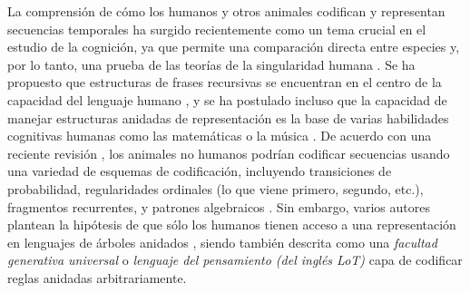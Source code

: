 
La comprensión de cómo los humanos y otros animales codifican y representan secuencias temporales ha surgido recientemente como un tema crucial en el estudio de la cognición, ya que permite una comparación directa entre especies y, por lo tanto, una prueba de las teorías de la singularidad humana \cite{f4,f5}. Se ha propuesto que estructuras de frases recursivas se encuentran en el centro de la capacidad del lenguaje humano \cite{f6}, y se ha postulado incluso que la capacidad de manejar estructuras anidadas de representación es la base de varias habilidades cognitivas humanas como las matemáticas o la música \cite{f4,f7,f8,f9}. De acuerdo con una reciente revisión \cite{f4}, los animales no humanos podrían codificar secuencias usando una variedad de esquemas de codificación, incluyendo transiciones de probabilidad, regularidades ordinales (lo que viene primero, segundo, etc.), fragmentos recurrentes, y patrones algebraicos \cite{f10,f11,f12,f13,f14}. Sin embargo, varios autores plantean la hipótesis de que sólo los humanos tienen acceso a una representación en lenguajes de árboles anidados \cite{f4,f8}, siendo también descrita como una \textit{facultad generativa universal} \cite{f9} o \textit{lenguaje del pensamiento (del inglés LoT)} \cite{fodor1975language} capa de codificar reglas anidadas arbitrariamente. 

